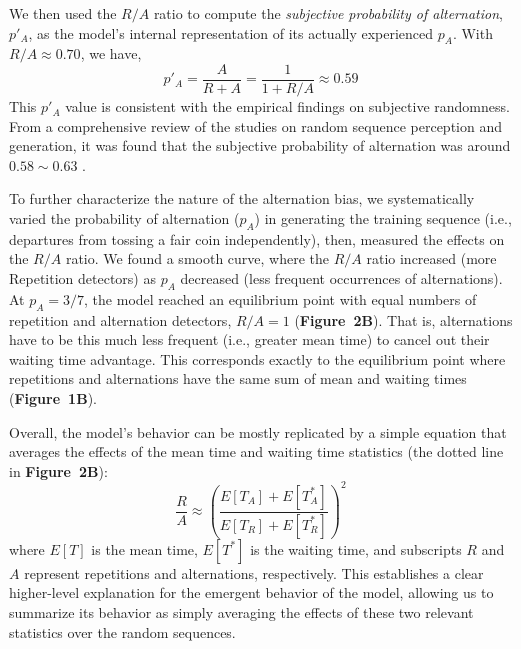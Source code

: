 \documentclass{pnastwo}
\begin{document}
\begin{article}
We then used the $R/A$ ratio to compute the \emph{subjective probability of alternation}, $p'_A$, as the model's internal representation of its actually experienced $p_A$.
With $R/A \approx 0.70$, we have,
\begin{equation}\label{eq:subjective-pa}
  p'_A = \frac{A}{R+A} = \frac{1}{1+ R/A} \approx 0.59
\end{equation}
This $p'_A$ value is consistent with the empirical findings on subjective randomness.
From a comprehensive review of the studies on random sequence perception and generation, it was found that the subjective probability of alternation was around $0.58\sim0.63$ \cite{Falk1997}.


To further characterize the nature of the alternation bias, we systematically varied the probability of alternation ($p_A$) in generating the training sequence (i.e., departures from tossing a fair coin independently), then, measured the effects on the $R/A$ ratio.
We found a smooth curve, where the $R/A$ ratio increased (more Repetition detectors) as $p_A$ decreased (less frequent occurrences of alternations).
At $p_A = 3/7$, the model reached an equilibrium point with equal numbers of repetition and alternation detectors, $R/A = 1$  (\textbf{Figure~2B}).
That is, alternations have to be this much less frequent (i.e., greater mean time) to cancel out their waiting time advantage.
This corresponds exactly to the equilibrium point where repetitions and alternations have the same sum of mean and waiting times (\textbf{Figure~1B}).



Overall, the model's behavior can be mostly replicated by a simple equation that averages the effects of the mean time and waiting time statistics (the dotted line in \textbf{Figure~2B}):
\begin{equation}\label{eq:time-ratio-squared}
  \frac{R}{A} \approx \left(\frac{E[T_A]+E[T^*_A]}{E[T_R]+E[T^*_R]}\right)^2
\end{equation}
where $E[T]$ is the mean time, $E[T^*]$ is the waiting time, and subscripts $R$ and $A$ represent repetitions and alternations, respectively.
This establishes a clear higher-level explanation for the emergent behavior of the model, allowing us to summarize its behavior as simply averaging the effects of these two relevant statistics over the random sequences.




\end{article}
\end{document}
